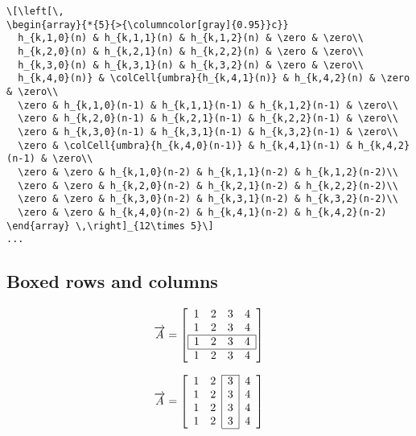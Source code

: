 \begin{table}[htb]
\begin{lstlisting}[xrightmargin=-\marginparwidth]
\[\left[\,
\begin{array}{*{5}{>{\columncolor[gray]{0.95}}c}}
  h_{k,1,0}(n) & h_{k,1,1}(n) & h_{k,1,2}(n) & \zero & \zero\\
  h_{k,2,0}(n) & h_{k,2,1}(n) & h_{k,2,2}(n) & \zero & \zero\\
  h_{k,3,0}(n) & h_{k,3,1}(n) & h_{k,3,2}(n) & \zero & \zero\\
  h_{k,4,0}(n)} & \colCell{umbra}{h_{k,4,1}(n)} & h_{k,4,2}(n) & \zero & \zero\\
  \zero & h_{k,1,0}(n-1) & h_{k,1,1}(n-1) & h_{k,1,2}(n-1) & \zero\\
  \zero & h_{k,2,0}(n-1) & h_{k,2,1}(n-1) & h_{k,2,2}(n-1) & \zero\\
  \zero & h_{k,3,0}(n-1) & h_{k,3,1}(n-1) & h_{k,3,2}(n-1) & \zero\\
  \zero & \colCell{umbra}{h_{k,4,0}(n-1)} & h_{k,4,1}(n-1) & h_{k,4,2}(n-1) & \zero\\
  \zero & \zero & h_{k,1,0}(n-2) & h_{k,1,1}(n-2) & h_{k,1,2}(n-2)\\
  \zero & \zero & h_{k,2,0}(n-2) & h_{k,2,1}(n-2) & h_{k,2,2}(n-2)\\
  \zero & \zero & h_{k,3,0}(n-2) & h_{k,3,1}(n-2) & h_{k,3,2}(n-2)\\
  \zero & \zero & h_{k,4,0}(n-2) & h_{k,4,1}(n-2) & h_{k,4,2}(n-2)
\end{array} \,\right]_{12\times 5}\]
...
\end{lstlisting}


\subsection{Boxed rows and columns}

\begin{LTXexample}[width=0.35\linewidth]
\[
\overrightarrow{A}=\left[
    \begin{array}{cccc}
	1 & 2 & 3 & 4\\
	1 & 2 & 3 & 4\\\hline
	\multicolumn{1}{|c}{1} & 2 & 3 & 
	\multicolumn{1}{c|}{4}\\\hline
	1 & 2 & 3 & 4
    \end{array}\right]
\]
\end{LTXexample}


\begin{LTXexample}[width=0.35\linewidth]
\[
\overrightarrow{A}=\left[
    \begin{array}{cc|c|c}\cline{3-3}
	1 & 2 & 3 & 4\\
	1 & 2 & 3 & 4\\
	1 & 2 & 3 & 4\\
	1 & 2 & 3 & 4\\\cline{3-3}
    \end{array}\right]
\]
\end{LTXexample}


\end{table}
